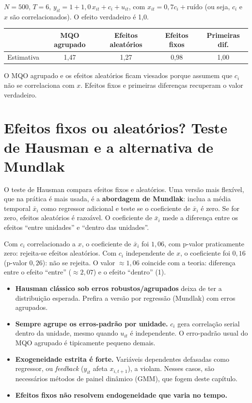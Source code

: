 \begin{simulacao}
$N=500$, $T=6$, $y_{it}=1+1{,}0\,x_{it}+c_i+u_{it}$, com $x_{it}=0{,}7c_i+\text{ruído}$ (ou seja, $c_i$ e $x$ são correlacionados). O efeito verdadeiro é 1,0.
\begin{center}
\begin{tabular}{lcccc}
\toprule
& MQO agrupado & Efeitos aleatórios & Efeitos fixos & Primeiras dif.\\
\midrule
Estimativa & 1,47 & 1,27 & 0,98 & 1,00 \\
\bottomrule
\end{tabular}
\end{center}
O MQO agrupado e os efeitos aleatórios ficam viesados porque assumem que $c_i$ não se correlaciona com $x$. Efeitos fixos e primeiras diferenças recuperam o valor verdadeiro.
\end{simulacao}

\section{Efeitos fixos ou aleatórios? Teste de Hausman e a alternativa de Mundlak}
O teste de Hausman compara efeitos fixos e aleatórios. Uma versão mais flexível, que na prática é mais usada, é a \textbf{abordagem de Mundlak}: inclua a média temporal $\bar x_i$ como regressor adicional e teste se o coeficiente de $\bar x_i$ é zero. Se for zero, efeitos aleatórios é razoável. O coeficiente de $\bar x_i$ mede a diferença entre os efeitos ``entre unidades'' e ``dentro das unidades''.

\begin{simulacao}
Com $c_i$ correlacionado a $x$, o coeficiente de $\bar x_i$ foi $1{,}06$, com p-valor praticamente zero: rejeita-se efeitos aleatórios. Com $c_i$ independente de $x$, o coeficiente foi $0{,}16$ (p-valor $0{,}26$): não se rejeita. O valor $\approx1{,}06$ coincide com a teoria: diferença entre o efeito ``entre'' ($\approx2{,}07$) e o efeito ``dentro'' (1).
\end{simulacao}

\begin{atencao}
\begin{itemize}[leftmargin=1.2em]
\item \textbf{Hausman clássico sob erros robustos/agrupados} deixa de ter a distribuição esperada. Prefira a versão por regressão (Mundlak) com erros agrupados.
\item \textbf{Sempre agrupe os erros-padrão por unidade.} $c_i$ gera correlação serial dentro da unidade, mesmo quando $u_{it}$ é independente. O erro-padrão usual do MQO agrupado é tipicamente pequeno demais.
\item \textbf{Exogeneidade estrita é forte.} Variáveis dependentes defasadas como regressor, ou \emph{feedback} ($y_{it}$ afeta $x_{i,t+1}$), a violam. Nesses casos, são necessários métodos de painel dinâmico (GMM), que fogem deste capítulo.
\item \textbf{Efeitos fixos não resolvem endogeneidade que varia no tempo.}
\end{itemize}
\end{atencao}

